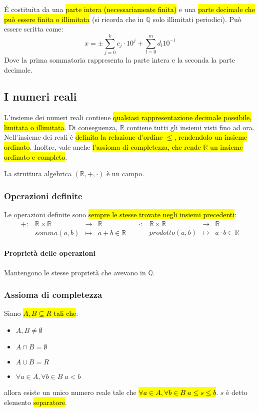 \'E costituita da una \hl{parte intera (necessariamente finita)} e una \hl{parte
decimale che può essere finita o illimitata} (si ricorda che in $\mathbb{Q}$ solo
illimitati periodici). Può essere scritta come:
\[ x = \pm \sum_{j=0}^k c_j \cdot 10^j + \sum_{l=0}^m d_l 10^{-l} \]
Dove la prima sommatoria rappresenta la parte intera e la seconda la parte 
decimale.

\subsection{I numeri reali}
L'insieme dei numeri reali contiene \hl{qualsiasi rappresentazione decimale
possibile, limitata o illimitata}. Di conseguenza, $\mathbb{R}$ contiene tutti
gli insiemi visti fino ad ora. Nell'insieme dei reali è \hl{definita la relazione
d'ordine $\leq$, rendendolo un insieme ordinato}. Inoltre, vale anche \hl{l'assioma
di completezza, che rende $\mathbb{R}$ un insieme ordinato e completo}.

La struttura algebrica $(\mathbb{R}, +, \cdot)$ è un campo.

\subsubsection{Operazioni definite}
Le operazioni definite sono \hl{sempre le stesse trovate negli insiemi precedenti}:
\[
    \begin{array}{cccc}
        +: &\mathbb{R} \times \mathbb{R} &\to &\mathbb{R} \\
        &somma(a,b) &\mapsto & a + b \in \mathbb{R}
    \end{array} \quad
    \begin{array}{cccc}
        \cdot: &\mathbb{R} \times \mathbb{R} &\to &\mathbb{R} \\
        &prodotto(a,b) &\mapsto & a \cdot b \in \mathbb{R}
    \end{array}
\]

\paragraph{Proprietà delle operazioni} Mantengono le stesse proprietà che 
avevano in $\mathbb{Q}$. 

\subsubsection{Assioma di completezza}\label{sec:assioma-completezza}
Siano \hl{$A, B \subseteq R$ tali che}:
\begin{itemize}
    \item $A,B \neq \emptyset$
    \item $A \cap B = \emptyset$ 
    \item $A \cup B = R$
    \item $\forall a \in A, \forall b \in B \; a < b$ 
\end{itemize}
allora esiste un unico numero reale tale che 
\hl{$\forall a \in A, \forall b \in B \; a \leq s \leq b$}. $s$ è detto elemento 
\hl{separatore}. 

